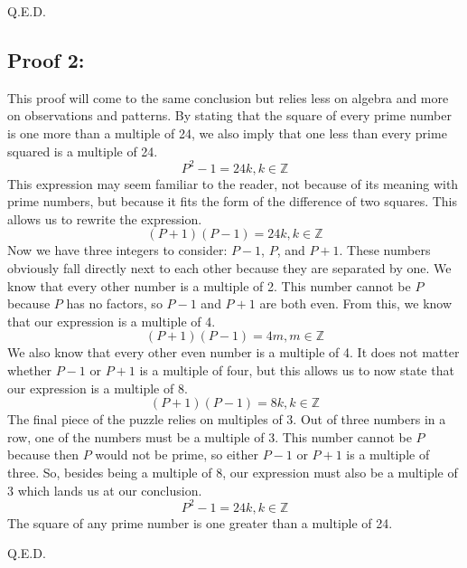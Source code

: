 Q.E.D.

\subsection*{Proof 2:}

This proof will come to the same conclusion but relies less on algebra and more on observations and patterns. By stating that the square of every prime number is one more than a multiple of 24, we also imply that one less than every prime squared is a multiple of 24.
\[P^2 - 1 = 24k, k \in \mathbb{Z}\]
This expression may seem familiar to the reader, not because of its meaning with prime numbers, but because it fits the form of the difference of two squares. This allows us to rewrite the expression.
\[(P + 1)(P - 1) = 24k, k \in \mathbb{Z}\]
Now we have three integers to consider: \(P - 1\), \(P\), and \(P + 1\). These numbers obviously fall directly next to each other because they are separated by one. We know that every other number is a multiple of 2. This number cannot be \(P\) because \(P\) has no factors, so \(P - 1\) and \(P + 1\) are both even. From this, we know that our expression is a multiple of 4.
\[(P + 1)(P - 1) = 4m, m \in \mathbb{Z}\]
We also know that every other even number is a multiple of 4. It does not matter whether \(P - 1\) or \(P + 1\) is a multiple of four, but this allows us to now state that our expression is a multiple of 8. 
\[(P + 1)(P - 1) = 8k, k \in \mathbb{Z}\]
The final piece of the puzzle relies on multiples of 3. Out of three numbers in a row, one of the numbers must be a multiple of 3. This number cannot be \(P\) because then \(P\) would not be prime, so either \(P - 1\) or \(P + 1\) is a multiple of three. So, besides being a multiple of 8, our expression must also be a multiple of 3 which lands us at our conclusion.
\[P^2 - 1 = 24k, k \in \mathbb{Z}\]
The square of any prime number is one greater than a multiple of 24.

Q.E.D.
